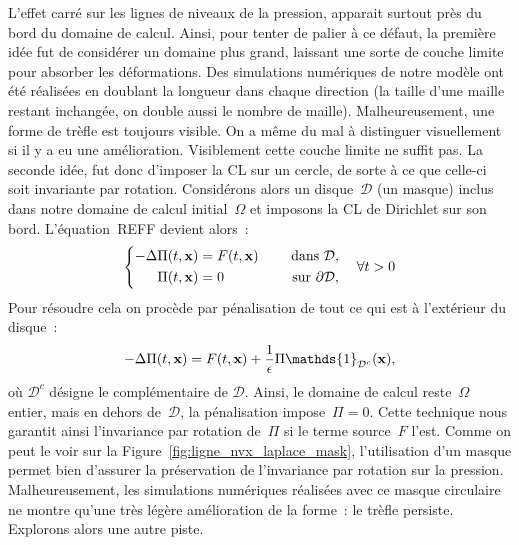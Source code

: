 \documentclass[main.tex]{subfiles}
\begin{document}
L'effet carré sur les lignes de niveaux de la pression, apparait surtout près du bord du domaine de calcul. Ainsi, pour tenter de palier à ce défaut, la première idée fut de considérer un domaine plus grand, laissant une sorte de couche limite pour absorber les déformations. Des simulations numériques de notre modèle ont été réalisées en doublant la longueur dans chaque direction (la taille d'une maille restant inchangée, on double aussi le nombre de maille). Malheureusement, une forme de trèfle est toujours visible. On a même du mal à distinguer visuellement si il y a eu une amélioration. Visiblement cette couche limite ne suffit pas. La seconde idée, fut donc d'imposer la CL sur un cercle, de sorte à ce que celle-ci soit invariante par rotation. Considérons alors un disque~$\mathcal{D}$ (un masque) inclus dans notre domaine de calcul initial~$\Omega$ et imposons la CL de Dirichlet sur son bord. L'équation~REFF devient alors~: 
\begin{equation}\label{eq:pression_iter1_mask}
\left\{
\begin{aligned}
-\Delta \Pi(t,\mathbf{x}) &= F(t,\mathbf{x}) & \quad \textrm{ dans }  \mathcal{D} , \\
\Pi(t,\mathbf{x}) &=0 & \quad \textrm{ sur  } \partial\mathcal{D},
\end{aligned}
\right. \quad \forall t>0
\end{equation}
Pour résoudre cela on procède par pénalisation de tout ce qui est à l'extérieur du disque~:
\begin{equation}
- \Delta \Pi(t,\vecx) = F(t,\vecx) + \frac{1}{\epsilon} \Pi \mathds{1}_{\mathcal{D}^c}(\vecx),
\end{equation}
où $\mathcal{D}^c$ désigne le complémentaire de $\mathcal{D}$. Ainsi, le domaine de calcul reste~$\Omega$ entier, mais en dehors de~$\mathcal{D}$, la pénalisation impose~$\Pi=0$. Cette technique nous garantit ainsi l'invariance par rotation de~$\Pi$ si le terme source~$F$ l'est. 
Comme on peut le voir sur la Figure~\ref{fig:ligne_nvx_laplace_mask}, l'utilisation d'un masque permet bien d'assurer la préservation de l'invariance par rotation sur la pression. Malheureusement, les simulations numériques réalisées avec ce masque circulaire ne montre qu'une très légère amélioration  de la forme~: le trèfle persiste. 
Explorons alors une autre piste. 
\end{document}
